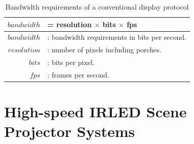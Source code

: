     \begin{table}
        \centering
        \large
        \begin{tabular}{| r l |}
            \hline
            $bandwidth$ & = resolution $\times$ bits $\times$ fps \\ \hline
            $bandwidth$ & : bandwidth requirements in bits per second. \\
            $resolution$ & : number of pixels including porches. \\
            $bits$ & : bits per pixel. \\
            $fps$ & : frames per second. \\
            \hline
        \end{tabular}
        \caption{Bandwidth requirements of a conventional display protocol}
        \label{tbl:bandwidth}
    \end{table}

\section{High-speed IRLED Scene Projector Systems}
%

